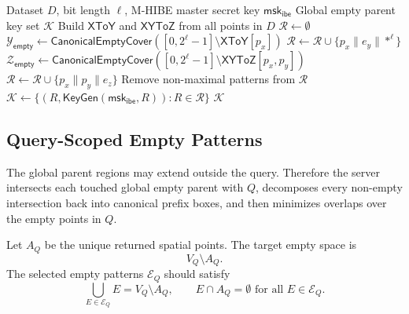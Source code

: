 \documentclass[11pt]{article}
\newcommand{\KeyGen}{\mathsf{KeyGen}}
\newcommand{\msk}{\mathsf{msk}}
\begin{document}
\begin{algorithm}[t]
\caption{Upload-time empty parent key generation}
\label{alg:upload-empty}
\begin{algorithmic}[1]
\Require Dataset $D$, bit length $\ell$, M-HIBE master secret key $\msk_{\mathsf{ibe}}$
\Ensure Global empty parent key set $\mathcal{K}$
\State Build $\mathsf{XToY}$ and $\mathsf{XYToZ}$ from all points in $D$
\State $\mathcal{R} \gets \emptyset$
  \State $\mathcal{Y}_{\mathsf{empty}} \gets \mathsf{CanonicalEmptyCover}([0,2^\ell-1]\setminus \mathsf{XToY}[p_x])$
    \State $\mathcal{R}\gets \mathcal{R}\cup\{p_x\parallel e_y\parallel *^\ell\}$
  \EndFor
\EndFor
{}
  \State $\mathcal{Z}_{\mathsf{empty}} \gets \mathsf{CanonicalEmptyCover}([0,2^\ell-1]\setminus \mathsf{XYToZ}[p_x,p_y])$
    \State $\mathcal{R}\gets \mathcal{R}\cup\{p_x\parallel p_y\parallel e_z\}$
  \EndFor
\EndFor
\State Remove non-maximal patterns from $\mathcal{R}$
\State $\mathcal{K}\gets \{(R,\KeyGen(\msk_{\mathsf{ibe}},R)) : R\in \mathcal{R}\}$
\State \Return $\mathcal{K}$
\end{algorithmic}
\end{algorithm}

\subsection{Query-Scoped Empty Patterns}

The global parent regions may extend outside the query. Therefore the server intersects each touched global empty parent with $Q$, decomposes every non-empty intersection back into canonical prefix boxes, and then minimizes overlaps over the empty points in $Q$.

Let $A_Q$ be the unique returned spatial points. The target empty space is
\[
  V_Q \setminus A_Q.
\]
The selected empty patterns $\mathcal{E}_Q$ should satisfy
\[
  \bigcup_{E\in\mathcal{E}_Q} E = V_Q\setminus A_Q,
  \qquad
  E\cap A_Q=\emptyset \text{ for all } E\in\mathcal{E}_Q.
\]
\end{document}
